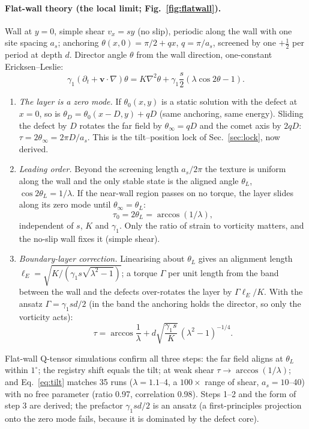 \documentclass[11pt,a4paper]{article}
\newcommand{\half}{\tfrac12}
\begin{document}
\paragraph{Flat-wall theory (the local limit; Fig.~\ref{fig:flatwall}).} Wall at $y=0$, simple shear $v_x=sy$ (no slip), periodic along the wall with one site spacing $a_s$;
anchoring $\theta(x,0)=\pi/2+qx$, $q=\pi/a_s$, screened by one $+\half$ per period at depth $d$. Director angle $\theta$ from the wall direction, one-constant Ericksen--Leslie:
\begin{equation}
\gamma_1(\partial_t+\mathbf v\cdot\nabla)\theta = K\nabla^2\theta+\gamma_1\frac{s}{2}\left(\lambda\cos2\theta-1\right).
\end{equation}
\begin{enumerate}
  \item \emph{The layer is a zero mode.} If $\theta_0(x,y)$ is a static solution with the defect at $x=0$, so is $\theta_D=\theta_0(x-D,y)+qD$ (same anchoring, same energy). Sliding the
        defect by $D$ rotates the far field by $\theta_\infty=qD$ and the comet axis by $2qD$: $\tau=2\theta_\infty=2\pi D/a_s$. This is the tilt--position lock of Sec.~\ref{sec:lock}, now derived.
  \item \emph{Leading order.} Beyond the screening length $a_s/2\pi$ the texture is uniform along the wall and the only stable state is the aligned angle $\theta_L$, $\cos2\theta_L=1/\lambda$.
        If the near-wall region passes on no torque, the layer slides along its zero mode until $\theta_\infty=\theta_L$:
        \begin{equation}\tau_0=2\theta_L=\arccos(1/\lambda),\end{equation}
        independent of $s$, $K$ and $\gamma_1$. Only the ratio of strain to vorticity matters, and the no-slip wall fixes it (simple shear).
  \item \emph{Boundary-layer correction.} Linearising about $\theta_L$ gives an alignment length $\ell_E=\sqrt{K/(\gamma_1 s\sqrt{\lambda^2-1})}$; a torque $\Gamma$ per unit length from the
        band between the wall and the defects over-rotates the layer by $\Gamma\ell_E/K$. With the ansatz $\Gamma=\gamma_1 sd/2$ (in the band the anchoring holds the director, so only
        the vorticity acts):
        \begin{equation}\tau=\arccos\frac1\lambda+d\sqrt{\frac{\gamma_1 s}{K}}\,(\lambda^2-1)^{-1/4}.\label{eq:tilt}\end{equation}
\end{enumerate}
Flat-wall Q-tensor simulations confirm all three steps: the far field aligns at $\theta_L$ within $1^\circ$; the registry shift equals the tilt; at weak shear $\tau\to\arccos(1/\lambda)$;
and Eq.~\eqref{eq:tilt} matches 35 runs ($\lambda=1.1$--4, a $100\times$ range of shear, $a_s=10$--40) with no free parameter (ratio 0.97, correlation 0.98). Steps 1--2 and the
form of step 3 are derived; the prefactor $\gamma_1 sd/2$ is an ansatz (a first-principles projection onto the zero mode fails, because it is dominated by the defect core).
\end{document}
